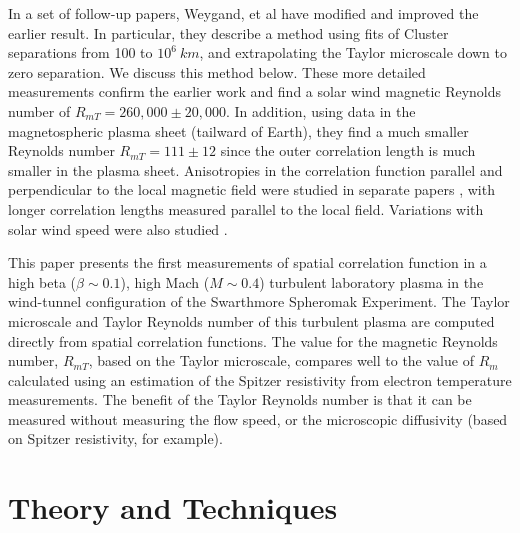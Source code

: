 \documentclass[aps,prl,amsmath,amssymb,reprint,superscriptaddress]{revtex4-1} %
\begin{document}
In a set of follow-up papers, Weygand, et al \cite{Weygand07,Weygand09,Weygand10,Weygand11} have modified and improved the earlier result.  In particular, they describe a method using fits of Cluster separations \cite{Weygand07} from 100 to $10^6~km$, and extrapolating the Taylor microscale down to zero separation.  We discuss this method below.  These more detailed measurements confirm the earlier work  \cite{Matthaeus05} and find a solar wind magnetic Reynolds number of $R_{mT}  = 260,000 \pm 20,000$.  In addition, using data in the magnetospheric plasma sheet (tailward of Earth), they find a much smaller Reynolds number $R_{mT}  = 111 \pm 12$ since the outer correlation length is much smaller in the plasma sheet.  Anisotropies in the correlation function parallel and perpendicular to the local magnetic field were studied in separate papers \cite{Weygand09,Weygand10}, with longer correlation lengths measured parallel to the local field.  Variations with solar wind speed were also studied \cite{Weygand11}.

This paper presents the first measurements of spatial correlation function in a high beta ($\beta \sim 0.1$), high Mach ($M \sim 0.4$) turbulent laboratory plasma in the wind-tunnel configuration of the Swarthmore Spheromak Experiment. The Taylor microscale and Taylor Reynolds number of this turbulent plasma are computed directly from spatial correlation functions. The value for the magnetic Reynolds number, $R_{mT}$, based on the Taylor microscale, compares well to the value of $R_{m}$ calculated using an estimation of the Spitzer resistivity from electron temperature measurements.  The benefit of the Taylor Reynolds number is that it can be measured without measuring the flow speed, or the microscopic diffusivity (based on Spitzer resistivity, for example).  


\section{Theory and Techniques}
\end{document}
